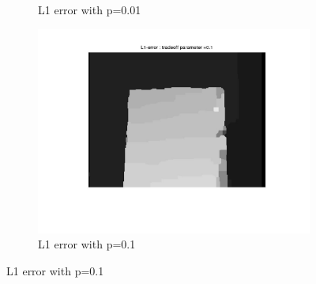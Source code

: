 \documentclass[fleqn]{article}
\begin{document}
\begin{figure}[!ht]
\begin{subfigure}{0.5\textwidth}
\caption{L1 error with p=0.01}
\end{subfigure}
 \begin{subfigure}{0.5\textwidth}
\includegraphics[scale=0.2]{./pics/map_L1_error_p=0.1.jpg}
\caption{L1 error with p=0.1}
\end{subfigure}
\end{figure}
\end{document}
